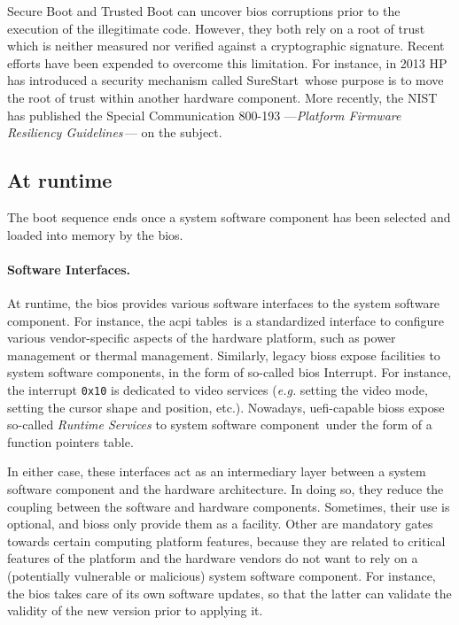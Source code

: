 Secure Boot and Trusted Boot can uncover \ac{bios} corruptions prior to the
execution of the illegitimate code.
%
However, they both rely on a root of trust which is neither measured nor
verified against a cryptographic signature.
%
Recent efforts have been expended to overcome this limitation.
%
For instance, in 2013 HP has introduced a security mechanism called
SureStart\,\cite{hp2016surestart} whose purpose is to move the root of trust
within another hardware component.
%
More recently, the NIST has published the Special Communication 800-193
---\emph{Platform Firmware Resiliency
  Guidelines}\,\cite{regenscheid2018nist800193}--- on the subject.

\subsection{At runtime}
\label{subsec:usecase:firm:runtime}

The boot sequence ends once a system software component has been selected and
loaded into memory by the \ac{bios}.

\paragraph{Software Interfaces.}
At runtime, the \ac{bios} provides various software interfaces to the system
software component.
%
For instance, the \ac{acpi} tables\,\cite{uefi2017acpi,duflot2010acpi} is a
standardized interface to configure various vendor-specific aspects of the
hardware platform, such as power management or thermal management.
%
Similarly, legacy \acp{bios} expose facilities to system software components, in
the form of so-called \ac{bios} Interrupt.
%
For instance, the interrupt \texttt{0x10} is dedicated to video services
(\emph{e.g.} setting the video mode, setting the cursor shape and position,
etc.).
%
Nowadays, \ac{uefi}-capable \acp{bios} expose so-called \emph{Runtime Services}
to system software component\,\cite[Chapter 5]{zimmer2017uefi} under the form of
a function pointers table.

In either case, these interfaces act as an intermediary layer between a system
software component and the hardware architecture.
%
In doing so, they reduce the coupling between the software and hardware
components.
%
Sometimes, their use is optional, and \acp{bios} only provide them as a
facility.
%
Other are mandatory gates towards certain computing platform features, because
they are related to critical features of the platform and the hardware vendors
do not want to rely on a (potentially vulnerable or malicious) system software
component.
%
For instance, the \ac{bios} takes care of its own software updates, so that the
latter can validate the validity of the new version prior to applying it.

